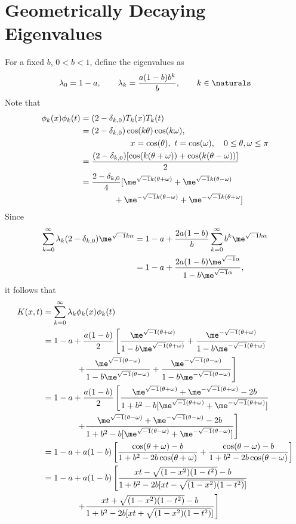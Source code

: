 \documentclass[]{elsarticle}
\theoremstyle{definition}
\begin{document}
\section{Geometrically Decaying Eigenvalues}
For a fixed $b$, $0<b<1$, define the eigenvalues as 
\begin{equation}
\lambda_0=1-a, \qquad \lambda_k = \frac{a (1-b) b^{k}}{b}, \qquad k \in \naturals
\end{equation}
Note that 
\begin{align}
\nonumber
\phi_k(x)\phi_k(t) & = (2-\delta_{k,0}) T_k(x)T_k(t) \\
\nonumber
&=(2-\delta_{k,0}) \cos(k\theta)\cos(k \omega), \\
\nonumber
&\qquad \qquad \qquad x=\cos(\theta), \ t =\cos(\omega), \quad 0 \le \theta,\omega \le \pi \\
&=\frac{(2-\delta_{k,0})[\cos(k(\theta+\omega)) + \cos(k(\theta-\omega))]}{2} \label{sumcos}\\
&=\frac{2-\delta_{k,0}}{4}[\me^{\sqrt{-1}k(\theta+\omega)} + \me^{\sqrt{-1}k(\theta-\omega) } \nonumber \\
& \qquad \qquad + \me^{-\sqrt{-1}k(\theta-\omega)} + \me^{-\sqrt{-1}k(\theta+\omega}]
\label{sumcompexp}
\end{align}
Since
\begin{align*}
\sum_{k=0}^{\infty} \lambda_k (2-\delta_{k,0}) \me^{\sqrt{-1}k\alpha} 
&= 1-a + \frac{2a(1-b)}{b}\sum_{k=0}^{\infty} b^k \me^{\sqrt{-1}k\alpha} \\
&= 1-a + \frac{2a(1-b)\me^{\sqrt{-1}\alpha}} {1-b\me^{\sqrt{-1}\alpha}},
\end{align*}
it follows that
\begin{align*}
K(x,t) &= \sum_{k=0}^{\infty} \lambda_k \phi_k(x)\phi_k(t) \\
&= 1-a + \frac{a(1-b)}{2}\left[ \frac{\me^{\sqrt{-1}(\theta+\omega)}}{1-b\me^{\sqrt{-1}(\theta+\omega)}} + \frac{\me^{-\sqrt{-1}(\theta+\omega)}}{1-b\me^{-\sqrt{-1}(\theta+\omega)}} \right . \\
& \qquad \qquad \left . + \frac{\me^{\sqrt{-1}(\theta-\omega)}}{1-b\me^{\sqrt{-1}(\theta-\omega)}} + \frac{\me^{-\sqrt{-1}(\theta-\omega)}}{1-b\me^{-\sqrt{-1}(\theta-\omega)}}  \right] \\
&=  1-a + \frac{a(1-b)}{2} \left[ \frac{\me^{\sqrt{-1}(\theta+\omega)} + \me^{-\sqrt{-1}(\theta+\omega)} - 2b } {1+b^2 -b[\me^{\sqrt{-1}(\theta+\omega)} + \me^{-\sqrt{-1}(\theta+\omega)}] } \right . \\
& \qquad \qquad \left . + \frac{\me^{\sqrt{-1}(\theta-\omega)}+\me^{-\sqrt{-1}(\theta-\omega)} - 2b } {1+b^2 -b[\me^{\sqrt{-1}(\theta-\omega)} + \me^{-\sqrt{-1}(\theta-\omega)}] }  \right] \\
&= 1-a + a(1-b) \left[\frac{\cos(\theta+\omega)-b} {1+b^2 -2b\cos(\theta+\omega) } + \frac{\cos(\theta-\omega)-b} {1+b^2 -2b\cos(\theta-\omega) }  \right] \\ 
&= 1-a + a(1-b) \left[\frac{xt-\sqrt{(1-x^2)(1-t^2)}-b} {1+b^2 -2b[xt-\sqrt{(1-x^2)(1-t^2)}] } \right. \\
& \qquad \qquad \left .  + \frac{xt+\sqrt{(1-x^2)(1-t^2)}-b} {1+b^2 -2b[xt+\sqrt{(1-x^2)(1-t^2)}] }  \right] \\ 
\end{align*}
\end{document}
